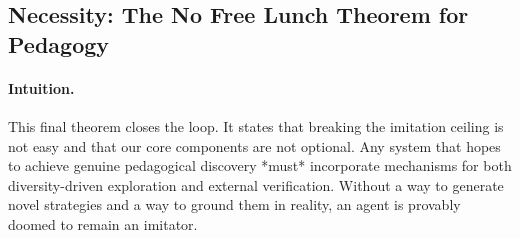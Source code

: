 \subsection{Necessity: The No Free Lunch Theorem for Pedagogy}
\paragraph{Intuition.} This final theorem closes the loop. It states that breaking the imitation ceiling is not easy and that our core components are not optional. Any system that hopes to achieve genuine pedagogical discovery *must* incorporate mechanisms for both diversity-driven exploration and external verification. Without a way to generate novel strategies and a way to ground them in reality, an agent is provably doomed to remain an imitator.

